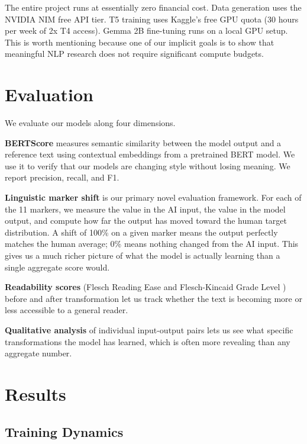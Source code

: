 \documentclass{article}
\begin{document}
The entire project runs at essentially zero financial cost. Data generation uses the NVIDIA NIM free API tier. T5 training uses Kaggle's free GPU quota (30 hours per week of 2x T4 access). Gemma 2B fine-tuning runs on a local GPU setup. This is worth mentioning because one of our implicit goals is to show that meaningful NLP research does not require significant compute budgets.

\section{Evaluation}

We evaluate our models along four dimensions.

\textbf{BERTScore} \cite{zhang2019bertscore} measures semantic similarity between the model output and a reference text using contextual embeddings from a pretrained BERT model. We use it to verify that our models are changing style without losing meaning. We report precision, recall, and F1.

\textbf{Linguistic marker shift} is our primary novel evaluation framework. For each of the 11 markers, we measure the value in the AI input, the value in the model output, and compute how far the output has moved toward the human target distribution. A shift of 100\% on a given marker means the output perfectly matches the human average; 0\% means nothing changed from the AI input. This gives us a much richer picture of what the model is actually learning than a single aggregate score would.

\textbf{Readability scores} (Flesch Reading Ease and Flesch-Kincaid Grade Level \cite{kincaid1975derivation}) before and after transformation let us track whether the text is becoming more or less accessible to a general reader.

\textbf{Qualitative analysis} of individual input-output pairs lets us see what specific transformations the model has learned, which is often more revealing than any aggregate number.

\section{Results}

\subsection{Training Dynamics}
\end{document}

